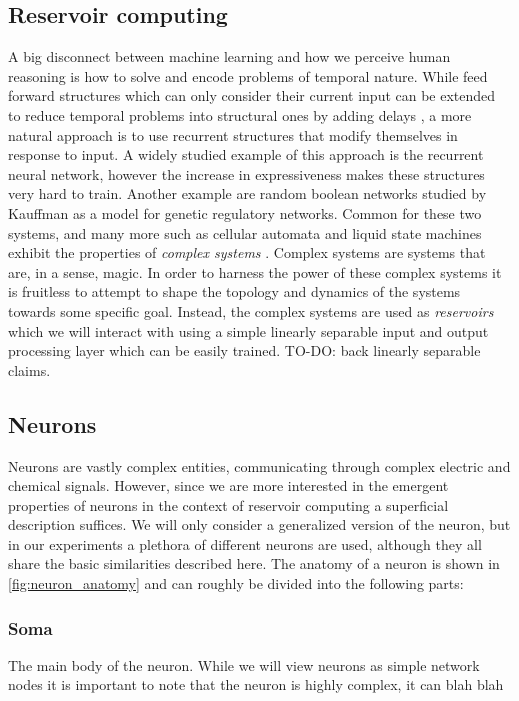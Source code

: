 \subsection{Reservoir computing}
A big disconnect between machine learning and how we perceive human reasoning is
how to solve and encode problems of temporal nature.
While feed forward structures which can only consider their current input can be
extended to reduce temporal problems into structural ones by adding delays
\cite{schrauwen_overview_2007}, a more natural approach is to use
recurrent structures that modify themselves in response to input.
A widely studied example of this approach is the recurrent neural network,
however the increase in expressiveness makes these structures very hard to train\cite{bertschinger_real-time_2004}.
Another example are random boolean networks \cite{gershenson_introduction_2004} studied by Kauffman as a
model for genetic regulatory networks.
Common for these two systems, and many more such as cellular
automata \cite{sipper_emergence_1999} and liquid state machines exhibit the
properties of \textit{complex systems} \cite{langton_computation_1990}.
Complex systems are systems that are, in a sense, magic.
In order to harness the power of these complex systems it is fruitless to
attempt to shape the topology and dynamics of the systems towards some specific
goal. Instead, the complex systems are used as \textit{reservoirs} which we will
interact with using a simple linearly separable input and output processing
layer which can be easily trained. \cite{schrauwen_overview_2007}
TO-DO: back linearly separable claims.
\subsection{Neurons}
Neurons are vastly complex entities, communicating through complex electric
and chemical signals. However, since we are more interested in the emergent
properties of neurons in the context of reservoir computing a superficial
description suffices.
We will only consider a generalized version of the neuron, but in our
experiments a plethora of different neurons are used, although they
all share the basic similarities described here.
The anatomy of a neuron is shown in \ref{fig:neuron_anatomy} and can roughly be
divided into the following parts:
\subsubsection{Soma}
The main body of the neuron. While we will view neurons as simple network nodes
it is important to note that the neuron is highly complex, it can blah blah
